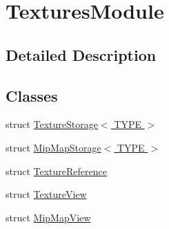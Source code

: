 \hypertarget{group___textures_module}{}\section{Textures\+Module}
\label{group___textures_module}


\subsection{Detailed Description}
\subsection*{Classes}
\begin{DoxyCompactItemize}
\item 
struct \hyperlink{struct_texture_storage}{Texture\+Storage$<$ T\+Y\+P\+E $>$}
\item 
struct \hyperlink{struct_mip_map_storage}{Mip\+Map\+Storage$<$ T\+Y\+P\+E $>$}
\item 
struct \hyperlink{struct_texture_reference}{Texture\+Reference}
\item 
struct \hyperlink{struct_texture_view}{Texture\+View}
\item 
struct \hyperlink{struct_mip_map_view}{Mip\+Map\+View}
\end{DoxyCompactItemize}
